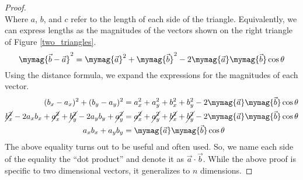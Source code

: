 \documentclass[11pt]{article}
\newtheorem{proof}{Proof}
\begin{document}
\begin{proof}
\begin{equation*}
\end{equation*}
Where $a$, $b$, and $c$ refer to the length of each side of the triangle. Equivalently, we can express lengths as the magnitudes of the vectors shown on the right triangle of Figure \ref{two_triangles}.
\begin{equation*}
    \mymag{\vec{b}-\vec{a}}^2=\mymag{\vec{a}}^2+\mymag{\vec{b}}^2-2\mymag{\vec{a}}\mymag{\vec{b}}\cos{\theta}
\end{equation*}
Using the distance formula, we expand the expressions for the magnitudes of each vector.
\begin{align*}
    (b_x-a_x)^2 + (b_y-a_y)^2 &= a_x^2 + a_y^2 + b_x^2 + b_y^2 - 2\mymag{\vec a}\mymag{\vec b}\cos{\theta}\\
    \cancel{b_x^2}-2a_xb_x+\cancel{a_x^2}+\cancel{b_y^2}-2a_yb_y+\cancel{a_y^2}	&= \cancel{a_x^2} + \cancel{a_y^2} + \cancel{b_x^2} + \cancel{b_y^2} - 2\mymag{\vec a}\mymag{\vec b}\cos{\theta}\\
    a_xb_x+a_yb_y &= \mymag{\vec a}\mymag{\vec b}\cos{\theta}
\end{align*}
The above equality turns out to be useful and often used. So, we name each side of the equality the ``dot product'' and denote it as $\vec{a} \cdot \vec{b}$. While the above proof is specific to two dimensional vectors, it generalizes to $n$ dimensions.
\end{proof}
\end{document}
